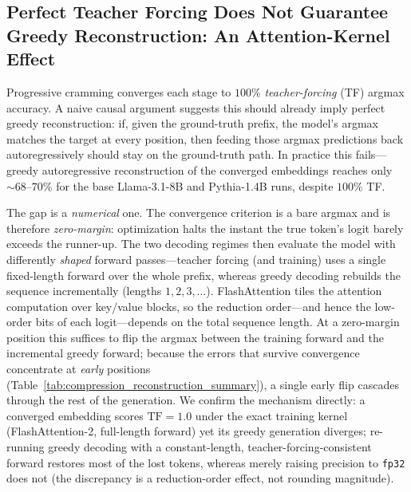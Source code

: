 \subsection{Perfect Teacher Forcing Does Not Guarantee Greedy Reconstruction: An Attention-Kernel Effect}
\label{app:tf_vs_greedy_kernel}

Progressive cramming converges each stage to $100\%$ \emph{teacher-forcing} (TF) argmax accuracy. A naive causal argument suggests this should already imply perfect greedy reconstruction: if, given the ground-truth prefix, the model's argmax matches the target at every position, then feeding those argmax predictions back autoregressively should stay on the ground-truth path. In practice this fails---greedy autoregressive reconstruction of the converged embeddings reaches only $\sim\!68$--$70\%$ for the base Llama-3.1-8B and Pythia-1.4B runs, despite $100\%$ TF.

The gap is a \emph{numerical} one. The convergence criterion is a bare argmax and is therefore \emph{zero-margin}: optimization halts the instant the true token's logit barely exceeds the runner-up. The two decoding regimes then evaluate the model with differently \emph{shaped} forward passes---teacher forcing (and training) uses a single fixed-length forward over the whole prefix, whereas greedy decoding rebuilds the sequence incrementally (lengths $1, 2, 3, \dots$). FlashAttention tiles the attention computation over key/value blocks, so the reduction order---and hence the low-order bits of each logit---depends on the total sequence length. At a zero-margin position this suffices to flip the argmax between the training forward and the incremental greedy forward; because the errors that survive convergence concentrate at \emph{early} positions (Table~\ref{tab:compression_reconstruction_summary}), a single early flip cascades through the rest of the generation. We confirm the mechanism directly: a converged embedding scores $\mathrm{TF}{=}1.0$ under the exact training kernel (FlashAttention-2, full-length forward) yet its greedy generation diverges; re-running greedy decoding with a constant-length, teacher-forcing-consistent forward restores most of the lost tokens, whereas merely raising precision to \texttt{fp32} does not (the discrepancy is a reduction-order effect, not rounding magnitude).

